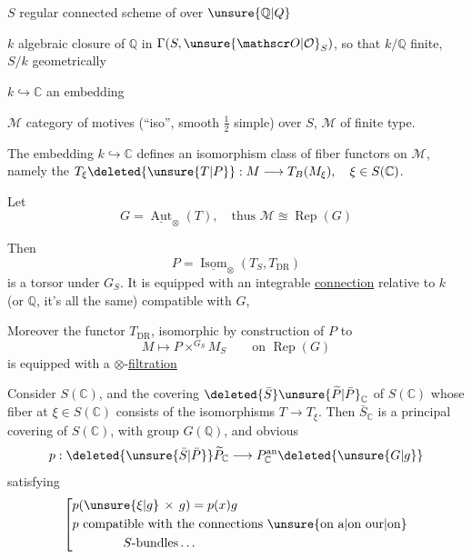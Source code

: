 $S$ regular connected scheme of  over $\unsure{\mathbb Q|Q}$

$k$ algebraic closure of $\mathbb Q$ in $\Gamma(S,\unsure{\mathscr O|\mathcal O}_S)$, so that $k/\mathbb Q$ finite, $S/k$ geometrically 

$k\hookrightarrow\mathbb C$ an embedding

$\mathcal M$ category of motives (``iso'', smooth $\frac12$ simple) over $S$, $\mathcal M$ of finite type.

The embedding $k\hookrightarrow\mathbb C$ defines an isomorphism class of fiber functors on $\mathcal M$, namely the $T_{\xi}\deleted{\unsure{T|P}}:M\longrightarrow T_B(M_{\xi}),\quad \xi\in S(\mathbb C)$.

Let  
\[
G=\underline{\operatorname{Aut}}_{\otimes}(T),\quad\text{thus }\mathcal M\approxeq\operatorname{Rep}(G)
\]

Then
\[
P=\underline{\operatorname{Isom}}_{\otimes}(T_S,T_{\mathrm{DR}})
\]
is a torsor under $G_S$. It is equipped with an integrable \uline{connection} relative to $k$ (or $\mathbb Q$, it's all the same) compatible with $G$,

Moreover the functor $T_{\mathrm{DR}}$, isomorphic by construction of $P$ to
\[
M\longmapsto P\mathbin{\times}^{G_S}M_S\qquad\text{on }\operatorname{Rep}(G)
\]
is equipped with a $\otimes$-\uline{filtration}

 Consider $S(\mathbb C)$, and the covering $\deleted{\bar S}\unsure{\widetilde P|\bar P}_{\mathbb C}$ of $S(\mathbb C)$ whose fiber at $\xi\in S(\mathbb C)$ consists of the isomorphisms $T\longrightarrow T_{\xi}$. Then $\bar S_{\mathbb C}$ is a principal covering of $S(\mathbb C)$, with group $G(\mathbb Q)$,  and     obvious 
\[
p:\deleted{\unsure{\bar S|\bar P}}\widetilde P_{\mathbb C}
\longrightarrow P_{\mathbb C}^{\mathrm{an}}\deleted{\unsure{G|g}}
\]
satisfying
\[
\left[\begin{aligned}
&p(\unsure{\xi|g}\,\times\,g)=p(x)g\\
&p\ \text{compatible with the connections \unsure{on a|on our|on}}\\
&\hspace{4em}S\text{-bundles}\ldots
\end{aligned}\right.
\]


